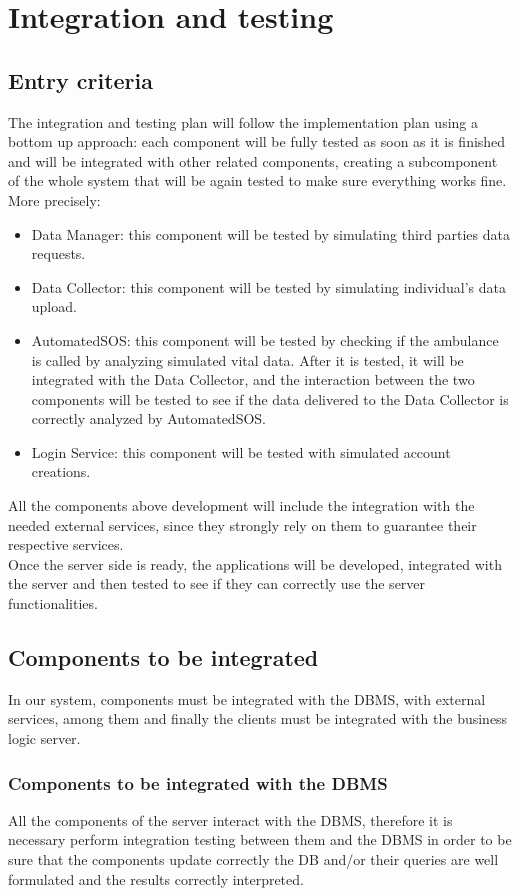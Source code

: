 \section{Integration and testing} 
\subsection{Entry criteria}
The integration and testing plan will follow the implementation plan using a bottom up approach: each component will be fully tested as soon as it is finished and will be integrated with other related components, creating a subcomponent of the whole system that will be again tested to make sure everything works fine.\\
More precisely:
\begin{itemize}
\item Data Manager: this component will be tested by simulating third parties data requests.
\item Data Collector: this component will be tested by simulating individual's data upload.
\item AutomatedSOS: this component will be tested by checking if the ambulance is called by analyzing simulated vital data. After it is tested, it will be integrated with the Data Collector, and the interaction between the two components will be tested to see if the data delivered to the Data Collector is correctly analyzed by AutomatedSOS.
\item Login Service: this component will be tested with simulated account creations.
\end{itemize}
All the components above development will include the integration with the needed external services, since they strongly rely on them to guarantee their respective services.\\
Once the server side is ready, the applications will be developed, integrated with the server and then tested to see if they can correctly use the server functionalities.


\subsection{Components to be integrated}
In our system, components must be integrated with the DBMS, with external services, among them and finally the clients must be integrated with the business logic server.

\subsubsection{Components to be integrated with the DBMS}
All the components of the server interact with the DBMS, therefore it is necessary perform integration testing between them and the DBMS in order to be sure that the components update correctly the DB and/or their queries are well formulated and the results correctly interpreted.

